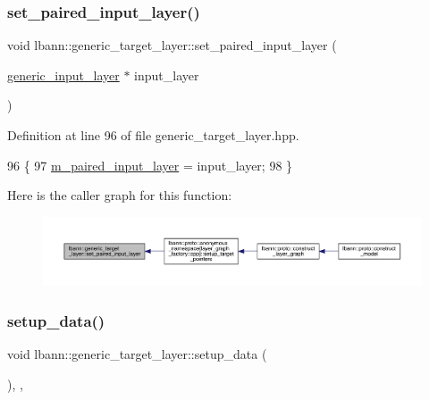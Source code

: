 \subsubsection{\texorpdfstring{set\+\_\+paired\+\_\+input\+\_\+layer()}{set\_paired\_input\_layer()}}
{\footnotesize\ttfamily void lbann\+::generic\+\_\+target\+\_\+layer\+::set\+\_\+paired\+\_\+input\+\_\+layer (\begin{DoxyParamCaption}\item[{\hyperlink{classlbann_1_1generic__input__layer}{generic\+\_\+input\+\_\+layer} $\ast$}]{input\+\_\+layer }\end{DoxyParamCaption})\hspace{0.3cm}{\ttfamily [inline]}}



Definition at line 96 of file generic\+\_\+target\+\_\+layer.\+hpp.


\begin{DoxyCode}
96                                                                 \{
97     \hyperlink{classlbann_1_1generic__target__layer_a84da1260e9feb4fbc3e6f2315e4cab4b}{m\_paired\_input\_layer} = input\_layer;
98   \}
\end{DoxyCode}
Here is the caller graph for this function\+:\nopagebreak
\begin{figure}[H]
\begin{center}
\leavevmode
\includegraphics[width=350pt]{classlbann_1_1generic__target__layer_ab1bf1a639db82f2dd6ef3994f2269ec2_icgraph}
\end{center}
\end{figure}
\mbox{\label{classlbann_1_1generic__target__layer_a73b35ee4dcb97a166369426d975596b2}} 
\subsubsection{\texorpdfstring{setup\+\_\+data()}{setup\_data()}}
{\footnotesize\ttfamily void lbann\+::generic\+\_\+target\+\_\+layer\+::setup\+\_\+data (\begin{DoxyParamCaption}{ }\end{DoxyParamCaption})\hspace{0.3cm}{\ttfamily [inline]}, {\ttfamily [override]}, {\ttfamily [virtual]}}


